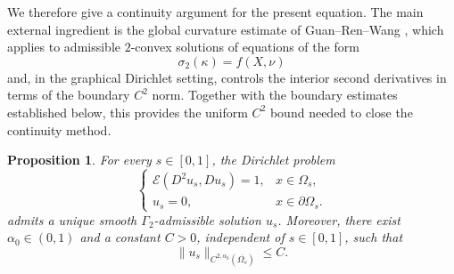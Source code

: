 \documentclass{article}
\newtheorem{proposition}[theorem]{Proposition}
\numberwithin{equation}{section}
\begin{document}
We therefore give a continuity argument for the present equation.
The main external ingredient is the global curvature estimate of
Guan--Ren--Wang \cite{GRW15}, which applies to admissible
$2$-convex solutions of equations of the form
\[
\sigma_2(\kappa)=f(X,\nu)
\]
and, in the graphical Dirichlet setting, controls the interior second
derivatives in terms of the boundary $C^2$ norm.
Together with the boundary estimates established below, this provides
the uniform $C^2$ bound needed to close the continuity method.

\begin{proposition}
\label{prop:real-solvability}
For every $s\in[0,1]$, the Dirichlet problem
\begin{equation}\label{eq:deformation-problem}
\begin{cases}
\mathcal E(D^2u_s,Du_s)=1,
& x\in\Omega_s,\\
u_s=0,
& x\in\partial\Omega_s.
\end{cases}
\end{equation}
admits a unique smooth $\Gamma_2$-admissible solution $u_s$.
Moreover, there exist $\alpha_0\in(0,1)$ and a constant $C>0$,
independent of $s\in[0,1]$, such that
\begin{equation}\label{eq:uniform-c2a}
\|u_s\|_{C^{2,\alpha_0}(\overline{\Omega_s})}\le C.
\end{equation}
\end{proposition}
\end{document}
